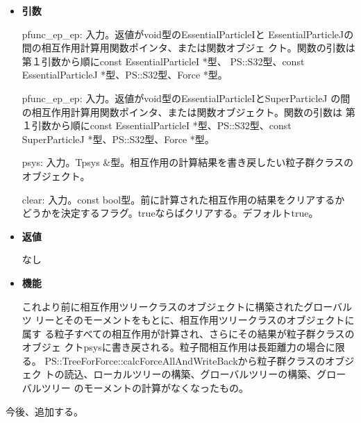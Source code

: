 \begin{itemize}

\item {\bf 引数}

pfunc\_ep\_ep: 入力。返値がvoid型のEssentialParticleIと
EssentialParticleJの間の相互作用計算用関数ポインタ、または関数オブジェ
クト。関数の引数は第１引数から順にconst EssentialParticleI *型、
PS::S32型、const EssentialParticleJ *型、PS::S32型、Force *型。

pfunc\_ep\_ep: 入力。返値がvoid型のEssentialParticleIとSuperParticleJ
の間の相互作用計算用関数ポインタ、または関数オブジェクト。関数の引数は
第１引数から順にconst EssentialParticleI *型、PS::S32型、const
SuperParticleJ *型、PS::S32型、Force *型。

psys: 入力。Tpsys \&型。相互作用の計算結果を書き戻したい粒子群クラスの
オブジェクト。

clear: 入力。const bool型。前に計算された相互作用の結果をクリアするか
どうかを決定するフラグ。trueならばクリアする。デフォルトtrue。

\item {\bf 返値}

なし

\item {\bf 機能}

これより前に相互作用ツリークラスのオブジェクトに構築されたグローバルツ
リーとそのモーメントをもとに、相互作用ツリークラスのオブジェクトに属す
る粒子すべての相互作用が計算され、さらにその結果が粒子群クラスのオブジェ
クトpsysに書き戻される。粒子間相互作用は長距離力の場合に限る。
PS::TreeForForce::calcForceAllAndWriteBackから粒子群クラスのオブジェク
トの読込、ローカルツリーの構築、グローバルツリーの構築、グローバルツリー
のモーメントの計算がなくなったもの。

\end{itemize}


今後、追加する。




